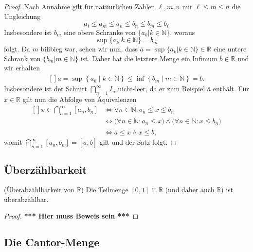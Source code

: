 \documentclass[../Analysis1_script.tex]{subfiles}
\begin{document}
\begin{proof}
	Nach Annahme gilt für natüurlichen Zahlen $\ell, m, n$ mit $\ell \leq m \leq n$ die Ungleichung
	\[a_{\ell} \leq a_m \leq a_n \leq b_n \leq b_m \leq b_{\ell}\]
	Insbesondere ist $b_m$ eine obere Schranke von $\{a_k | k \in \mathbb{N}\}$, woraus
	\[\sup\{a_k | k \in \mathbb{N}\} = b_m\]
	folgt. Da $m$ bilibieg war, sehen wir nun, dass $\bar{a} = \sup\{a_k | k \in \mathbb{N}\} \in \mathbb{R}$ eine untere Schrank von $\{b_m | m \in \mathbb{N}\}$ ist. Daher hat die letztere Menge ein Infimum $\bar{b} \in \mathbb{R}$ und wir erhalten 
	\[\begin{aligned}[]
		\overline {a} = \sup \left \lbrace {a_k} \mid {k\in \mathbb {N}}\right \rbrace \leq \inf \left \lbrace {b_m} \mid {m\in \mathbb {N}}\right \rbrace = \overline {b}.
	\end{aligned}\]
	Insbesondere ist der Schnitt $\bigcap _{n=1}^\infty I_n$ nicht-leer, da er zum Beispiel $\bar{a}$ enthält. Für $x \in \mathbb{R}$ gilt nun die Abfolge von Äquivalenzen 
	\[\begin{aligned}[]
		x \in \bigcap _{n=1}^\infty [a_n,b_n] &\iff \forall n\in \mathbb {N}: a_n \leq x \leq b_n\\ &\iff \big (\forall n\in \mathbb {N}: a_n\leq x\big ) \wedge \big (\forall n\in \mathbb {N}: x \leq b_n\big )\\ &\iff \overline {a} \leq x \wedge x \leq \overline {b},
	\end{aligned}\]
	womit $\bigcap _{n=1}^\infty [a_n,b_n] = [\bar {a},\bar {b}]$ gilt und der Satz folgt. 
\end{proof}

\subsection{Überzählbarkeit}

\begin{corollary}{(Überabzählbarkeit von $\mathbb{R}$)}
	Die Teilmenge $[0,1]\subseteq \mathbb {R}$ (und daher auch $\mathbb {R}$) ist überabzählbar. 
\end{corollary}

\begin{proof}
	\textbf{*** Hier muss Beweis sein ***}
\end{proof}
\subsection{Die Cantor-Menge}
\end{document}
